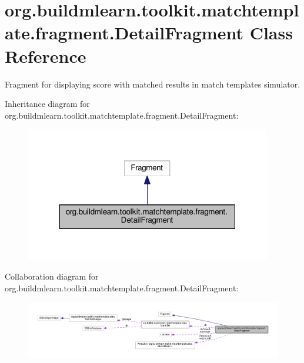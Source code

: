 \hypertarget{classorg_1_1buildmlearn_1_1toolkit_1_1matchtemplate_1_1fragment_1_1DetailFragment}{}\section{org.\+buildmlearn.\+toolkit.\+matchtemplate.\+fragment.\+Detail\+Fragment Class Reference}
\label{classorg_1_1buildmlearn_1_1toolkit_1_1matchtemplate_1_1fragment_1_1DetailFragment}


Fragment for displaying score with matched results in match template\textquotesingle{}s simulator.  




Inheritance diagram for org.\+buildmlearn.\+toolkit.\+matchtemplate.\+fragment.\+Detail\+Fragment\+:
\nopagebreak
\begin{figure}[H]
\begin{center}
\leavevmode
\includegraphics[width=304pt]{classorg_1_1buildmlearn_1_1toolkit_1_1matchtemplate_1_1fragment_1_1DetailFragment__inherit__graph}
\end{center}
\end{figure}


Collaboration diagram for org.\+buildmlearn.\+toolkit.\+matchtemplate.\+fragment.\+Detail\+Fragment\+:
\nopagebreak
\begin{figure}[H]
\begin{center}
\leavevmode
\includegraphics[width=350pt]{classorg_1_1buildmlearn_1_1toolkit_1_1matchtemplate_1_1fragment_1_1DetailFragment__coll__graph}
\end{center}
\end{figure}
